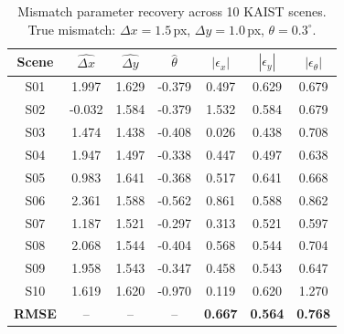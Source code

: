\begin{table}[t]
\centering
\caption{Mismatch parameter recovery across 10 KAIST scenes. True mismatch: $\Delta x=1.5$\,px, $\Delta y=1.0$\,px, $\theta=0.3^\circ$.}
\label{tab:param_recovery}
\small
\begin{tabular}{c ccc ccc}
\toprule
Scene & $\hat{\Delta x}$ & $\hat{\Delta y}$ & $\hat{\theta}$ & $|\epsilon_x|$ & $|\epsilon_y|$ & $|\epsilon_\theta|$ \\
\midrule
S01 & 1.997 & 1.629 & -0.379 & 0.497 & 0.629 & 0.679 \\
S02 & -0.032 & 1.584 & -0.379 & 1.532 & 0.584 & 0.679 \\
S03 & 1.474 & 1.438 & -0.408 & 0.026 & 0.438 & 0.708 \\
S04 & 1.947 & 1.497 & -0.338 & 0.447 & 0.497 & 0.638 \\
S05 & 0.983 & 1.641 & -0.368 & 0.517 & 0.641 & 0.668 \\
S06 & 2.361 & 1.588 & -0.562 & 0.861 & 0.588 & 0.862 \\
S07 & 1.187 & 1.521 & -0.297 & 0.313 & 0.521 & 0.597 \\
S08 & 2.068 & 1.544 & -0.404 & 0.568 & 0.544 & 0.704 \\
S09 & 1.958 & 1.543 & -0.347 & 0.458 & 0.543 & 0.647 \\
S10 & 1.619 & 1.620 & -0.970 & 0.119 & 0.620 & 1.270 \\
\midrule
\textbf{RMSE} & -- & -- & -- & \textbf{0.667} & \textbf{0.564} & \textbf{0.768} \\
\bottomrule
\end{tabular}
\end{table}